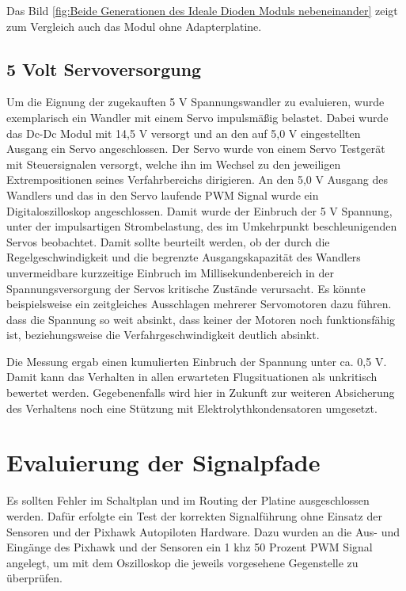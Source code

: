 Das Bild \ref{fig:Beide Generationen des Ideale Dioden Moduls nebeneinander} zeigt zum Vergleich auch das Modul ohne Adapterplatine.

\subsection{5 Volt Servoversorgung}

Um die Eignung der zugekauften 5 V Spannungswandler zu evaluieren, wurde exemplarisch ein Wandler mit einem Servo impulsmäßig belastet.
Dabei wurde das Dc-Dc Modul mit 14,5 V versorgt und an den auf 5,0 V eingestellten Ausgang ein Servo angeschlossen. Der Servo wurde von einem Servo Testgerät mit Steuersignalen versorgt, welche ihn im Wechsel zu den jeweiligen Extrempositionen seines Verfahrbereichs dirigieren. 
An den 5,0 V Ausgang des Wandlers und das in den Servo laufende PWM Signal wurde ein  Digitaloszilloskop angeschlossen. Damit  wurde der Einbruch der 5 V Spannung, unter der impulsartigen Strombelastung, des im Umkehrpunkt beschleunigenden Servos beobachtet.
Damit sollte beurteilt werden, ob der durch die Regelgeschwindigkeit und die begrenzte Ausgangskapazität des Wandlers unvermeidbare kurzzeitige Einbruch im Millisekundenbereich in der Spannungsversorgung der Servos kritische Zustände verursacht.
Es könnte beispielsweise ein zeitgleiches Ausschlagen mehrerer Servomotoren dazu führen. dass die Spannung so weit absinkt, dass keiner der Motoren noch funktionsfähig ist, beziehungsweise die Verfahrgeschwindigkeit deutlich absinkt.

Die Messung ergab einen kumulierten Einbruch der Spannung  unter ca. 0,5 V. 
Damit kann das Verhalten in allen erwarteten Flugsituationen als unkritisch bewertet werden. Gegebenenfalls wird hier in Zukunft zur weiteren Absicherung des Verhaltens noch eine Stützung mit Elektrolythkondensatoren umgesetzt. 

\section{Evaluierung der Signalpfade}

Es sollten Fehler im Schaltplan und im Routing der Platine ausgeschlossen werden. Dafür erfolgte ein Test der korrekten Signalführung ohne Einsatz der Sensoren und der Pixhawk Autopiloten Hardware. Dazu wurden an die Aus- und Eingänge des Pixhawk und der Sensoren ein 1 khz 50 Prozent PWM Signal angelegt, um mit dem Oszilloskop die jeweils vorgesehene Gegenstelle zu überprüfen.

